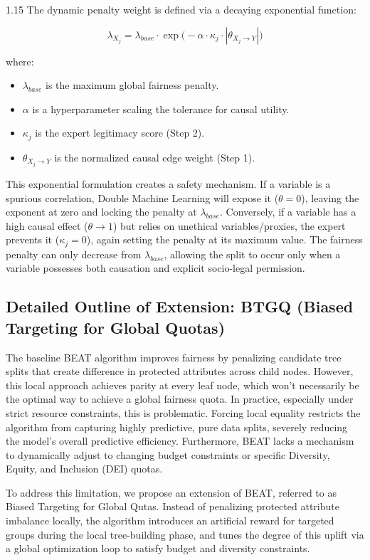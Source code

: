\documentclass[11pt, a4paper]{article}
\begin{document}
\begin{spacing}{1.15}
The dynamic penalty weight is defined via a decaying exponential function:


$$\lambda_{X_j} = \lambda_{base} \cdot \exp\Big(- \alpha \cdot \kappa_j \cdot |\theta_{X_j \rightarrow Y}| \Big)$$


where:
\begin{itemize}
\item $\lambda_{base}$ is the maximum global fairness penalty.
\item $\alpha$ is a hyperparameter scaling the tolerance for causal utility.
\item $\kappa_j$ is the expert legitimacy score (Step 2).
\item $\theta_{X_j \rightarrow Y}$ is the normalized causal edge weight (Step 1).
\end{itemize}

This exponential formulation creates a safety mechanism. If a variable is a spurious correlation, Double Machine Learning will expose it ($\theta = 0$), leaving the exponent at zero and locking the penalty at $\lambda_{base}$. Conversely, if a variable has a high causal effect ($\theta \to 1$) but relies on unethical variables/proxies, the expert prevents it ($\kappa_j = 0$), again setting the penalty at its maximum value. The fairness penalty can only decrease from $\lambda_{base}$, allowing the split to occur only when a variable possesses both causation and explicit socio-legal permission.

\subsection*{Detailed Outline of Extension: BTGQ (Biased Targeting for Global Quotas)}

The baseline BEAT algorithm improves fairness by penalizing candidate tree splits that create difference in protected attributes across child nodes. However, this local approach achieves parity at every leaf node, which won't necessarily be the optimal way to achieve a global fairness quota. In practice, especially under strict resource constraints, this is problematic. Forcing local equality restricts the algorithm from capturing highly predictive, pure data splits, severely reducing the model's overall predictive efficiency. Furthermore, BEAT lacks a mechanism to dynamically adjust to changing budget constraints or specific Diversity, Equity, and Inclusion (DEI) quotas.

To address this limitation, we propose an extension of BEAT, referred to as Biased Targeting for Global Qutas. Instead of penalizing protected attribute imbalance locally, the algorithm introduces an artificial reward for targeted groups during the local tree-building phase, and tunes the degree of this uplift via a global optimization loop to satisfy budget and diversity constraints.


\end{spacing}
\end{document}
